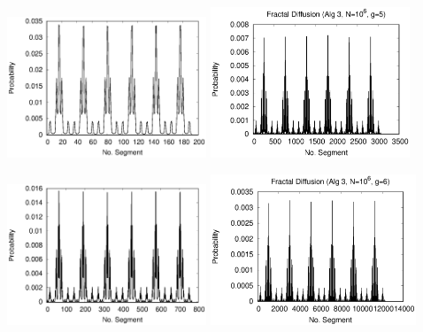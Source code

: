 \documentclass[9pt]{beamer}
\begin{document}
\begin{frame}[noframenumbering]
	\frametitle{}

	\begin{minipage}{0.48\linewidth}
	\begin{center}
		\includegraphics[height=4.2cm]{figs/pbbg3v3_EDIPP.eps}
		\includegraphics[height=4.5cm]{figs/pbbN1e6g5_v3.eps}
	\end{center}
	\end{minipage}
	\begin{minipage}{0.48\linewidth}
	\begin{center}
		\includegraphics[height=4.2cm]{figs/pbbg4v3_EDIPP.eps}
    	\includegraphics[height=4.5cm]{figs/pbbN1e6g6_v3.eps}
	\end{center}
	\end{minipage}
\end{frame}
\end{document}
